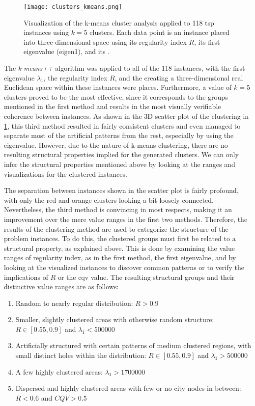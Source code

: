 \begin{figure}
	\centering
	\texttt{[image: clusters\_kmeans.png]}
	\caption[Visualization of the k-means cluster analysis]{Visualization of the k-means cluster analysis applied to 118 \gls{tsp} instances using $k=5$ clusters. Each data point is an instance placed into three-dimensional space using its regularity index $R$, its first eigenvalue (eigen1), and its .}
	\label{fig:clusters-kmeans}
\end{figure}

The \textit{k-means++} algorithm was applied to all of the 118 instances, with the first eigenvalue $\lambda_1$, the regularity index $R$, and the  creating a three-dimensional real Euclidean space within these instances were places. Furthermore, a value of $k = 5$ clusters proved to be the most effective, since it corresponds to the groups mentioned in the first method and results in the most visually verifiable coherence between instances. As shown in the 3D scatter plot of the clustering in \cref{fig:clusters-kmeans}, this third method resulted in fairly consistent clusters and even managed to separate most of the artificial patterns from the rest, especially by using the eigenvalue. However, due to the nature of k-means clustering, there are no resulting structural properties implied for the generated clusters. We can only infer the structural properties mentioned above by looking at the ranges and visualizations for the clustered instances.
 
 The separation between instances shown in the scatter plot is fairly profound, with only the red and orange clusters looking a bit loosely connected. Nevertheless, the third method is convincing in most respects, making it an improvement over the mere value ranges in the first two methods. Therefore, the results of the clustering method are used to categorize the structure of the problem instances. To do this, the clustered groups must first be related to a structural property, as explained above. This is done by examining the value ranges of regularity index, as in the first method, the first eigenvalue, and by looking at the visualized instances to discover common patterns or to verify the implications of $R$ or the \gls{cqv} value. The resulting structural groups and their distinctive value ranges are as follows:
 
 \begin{enumerate}
 	\item Random to nearly regular distribution: $R > 0.9$
 	\item Smaller, slightly clustered areas with otherwise random structure: $R \in [0.55, 0.9]$ and $\lambda_1 < 500 000$
 	\item Artificially structured with certain patterns of medium clustered regions, with small distinct holes within the distribution: $R \in [0.55, 0.9]$ and $\lambda_1 > 500 000$
 	\item A few highly clustered areas: $\lambda_1 > 1 700 000$
 	\item Dispersed and highly clustered areas with few or no city nodes in between: $R < 0.6$ and $CQV > 0.5$ \end{enumerate}

